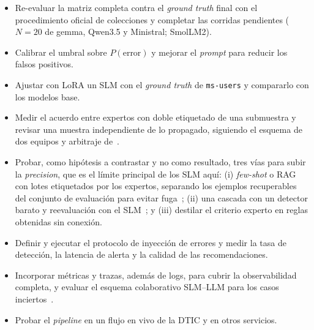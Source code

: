 \begin{itemize}
  \item Re-evaluar la matriz completa contra el \textit{ground truth} final con el procedimiento oficial de colecciones y completar las corridas pendientes ($N=20$ de gemma, Qwen3.5 y Ministral; SmolLM2).
  \item Calibrar el umbral sobre $P(\text{error})$ y mejorar el \textit{prompt} para reducir los falsos positivos.
  \item Ajustar con LoRA un SLM con el \textit{ground truth} de \texttt{ms-users} y compararlo con los modelos base.
  \item Medir el acuerdo entre expertos con doble etiquetado de una submuestra y revisar una muestra independiente de lo propagado, siguiendo el esquema de dos equipos y arbitraje de~\cite{sun2026_parsing}.
  \item Probar, como hipótesis a contrastar y no como resultado, tres vías para subir la \textit{precision}, que es el límite principal de los SLM aquí: (i) \textit{few-shot} o RAG con lotes etiquetados por los expertos, separando los ejemplos recuperables del conjunto de evaluación para evitar fuga~\cite{masri2026_slm_severity, zhang2024_logx}; (ii) una cascada con un detector barato y reevaluación con el SLM~\cite{zhang2024_lograg}; y (iii) destilar el criterio experto en reglas obtenidas sin conexión.
  \item Definir y ejecutar el protocolo de inyección de errores y medir la tasa de detección, la latencia de alerta y la calidad de las recomendaciones.
  \item Incorporar métricas y trazas, además de logs, para cubrir la observabilidad completa, y evaluar el esquema colaborativo SLM--LLM para los casos inciertos~\cite{ma2026_adaptivelog}.
  \item Probar el \textit{pipeline} en un flujo en vivo de la DTIC y en otros servicios.
\end{itemize}
